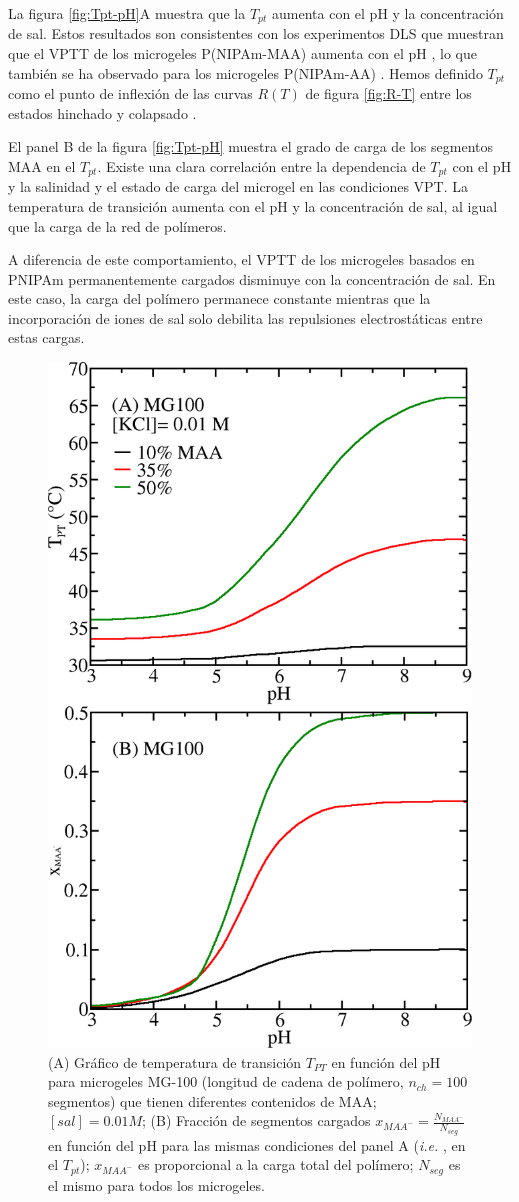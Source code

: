 La figura \ref{fig:Tpt-pH}A muestra que la $T_{pt}$ aumenta con el pH y la concentraci\'on de sal.
Estos resultados son consistentes con los experimentos DLS que muestran que el VPTT de los microgeles P(NIPAm-MAA) aumenta con el pH \addcite[Kleinen2008], lo que tambi\'en se ha observado para los microgeles P(NIPAm-AA) \addcite[CaprilesGonzalez2008].
Hemos definido $T_{pt}$ como el punto de inflexi\'on de las curvas $R(T)$ de figura \ref{fig:R-T} entre los estados hinchado y colapsado \addcite[Kratz2001].


El panel B de la figura \ref{fig:Tpt-pH} muestra el grado de carga de los segmentos MAA en el $T_{pt}$.
Existe una clara correlaci\'on entre la dependencia de $T_{pt}$ con el pH y la salinidad y el estado de carga del microgel en las condiciones VPT.
La temperatura de transici\'on aumenta con el pH y la concentraci\'on de sal, al igual que la carga de la red de pol\'imeros.

A diferencia de este comportamiento, el VPTT de los microgeles basados en PNIPAm permanentemente cargados disminuye con la concentraci\'on de sal\addcite[Lopez2020].
En este caso, la carga del pol\'imero permanece constante mientras que la incorporaci\'on de iones de sal solo debilita las repulsiones electrost\'aticas entre estas cargas.





\begin{figure}[!tb]
	\centering
	\includegraphics[width=0.5\linewidth]{Figures/graph-gel/Tpt-pH_MAA.png}
	\caption{(A) Gr\'afico de temperatura de transici\'on $T_{PT}$ en funci\'on del pH para microgeles MG-100 (longitud de cadena de pol\'imero, $n_{ch}=100$ segmentos) que tienen diferentes contenidos de MAA; $[sal]=0.01 M$;
	(B) Fracci\'on de segmentos cargados $x_{MAA^-}=\frac{N_{MAA^-}}{N_{seg}}$ en funci\'on del pH para las mismas condiciones del panel A (\emph{i.e.} , en el $T_{pt}$); $x_{MAA^-}$ es proporcional a la carga total del pol\'imero; $N_{seg}$ es el mismo para todos los microgeles.}
	\label{fig:Tpt_MAA}
\end{figure}


